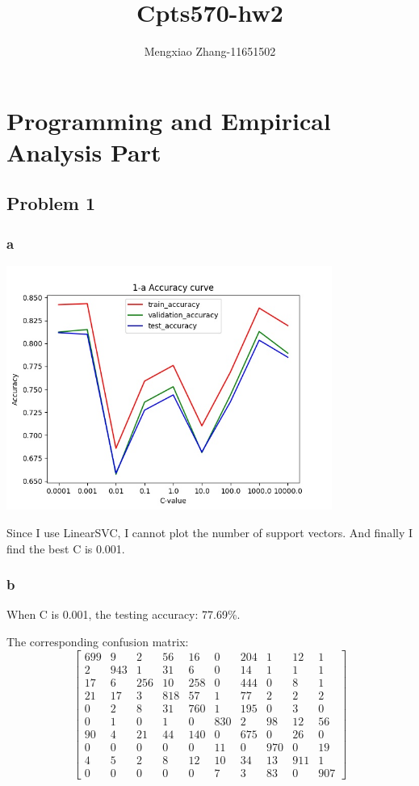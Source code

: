 \documentclass[12pt]{article}
\author{Mengxiao Zhang-11651502}
\title{Cpts570-hw2}
\begin{document}
    \maketitle
    \pagebreak
    \section{Programming and Empirical Analysis Part}
        \subsection{Problem 1}
            \subsubsection{a}
                \includegraphics[height=8cm]{part1_a}
                \par Since I use LinearSVC, I cannot plot the
                number of support vectors. And finally I find the best C is 0.001.
            \subsubsection{b}
                \par When C is 0.001, the testing accuracy: 77.69\%.
                \par The corresponding confusion matrix:
                \[
                \left[
                \begin{array}{cccccccccc}
                699 &  9  &  2  & 56 &  16 & 0 & 204 & 1 & 12 & 1  \\
                2   & 943 &  1  & 31 &  6  & 0 & 14  & 1 & 1  & 1  \\
                17  &  6  & 256 & 10 & 258 & 0 & 444 & 0 & 8  & 1  \\
                21  &17   &3    &818 &57   &1  &77   &2  &2   &2\\
                0   & 2   &8    &31  &760  &1  &195  &0  &3   &0\\
                0   &1    &0    &1   &0    &830&2    &98 &12  &56\\
                90  &4    &21   &44  &140  &0  &675  &0  &26  &0\\
                0&0&0&0&0&11&0&970&0&19\\
                4&5&2&8&12&10&34&13&911&1\\
                0&0&0&0&0&7&3&83&0&907
                \end{array}
                \right]
                \]
\end{document}
